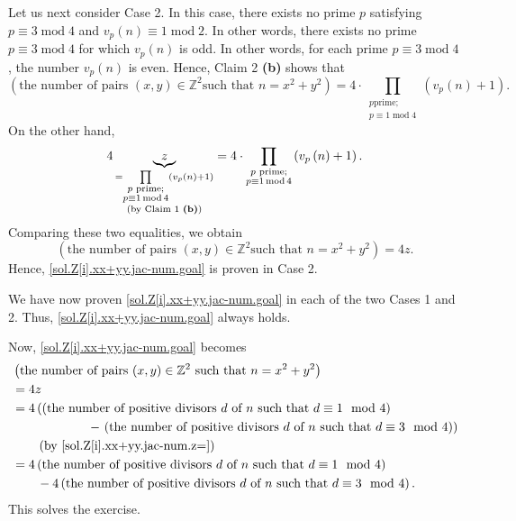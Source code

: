 \documentclass[paper=a4, fontsize=12pt]{scrartcl}%
\let\prodnonlimits\prod
\renewcommand{\prod}{\prodnonlimits\limits}
\theoremstyle{plainsl}
\theoremstyle{definition}
\theoremstyle{remark}
\begin{document}
Let us next consider Case 2. In this case, there exists no prime $p$
satisfying $p\equiv3\operatorname{mod}4$ and $v_{p}\left(  n\right)
\equiv1\operatorname{mod}2$. In other words, there exists no prime
$p\equiv3\operatorname{mod}4$ for which $v_{p}\left(  n\right)  $ is odd. In
other words, for each prime $p\equiv3\operatorname{mod}4$, the number
$v_{p}\left(  n\right)  $ is even. Hence, Claim 2 \textbf{(b)} shows that%
\[
\left(  \text{the number of pairs }\left(  x,y\right)  \in\mathbb{Z}^{2}\text{
such that }n=x^{2}+y^{2}\right)  =4\cdot\prod_{\substack{p\text{
prime;}\\p\equiv1\operatorname{mod}4}}\left(  v_{p}\left(  n\right)
+1\right)  .
\]
On the other hand,%
\[
4\underbrace{z}_{\substack{=\prod_{\substack{p\text{ prime;}\\p\equiv
1\operatorname{mod}4}}\left(  v_{p}\left(  n\right)  +1\right)  \\\text{(by
Claim 1 \textbf{(b)})}}}=4\cdot\prod_{\substack{p\text{ prime;}\\p\equiv
1\operatorname{mod}4}}\left(  v_{p}\left(  n\right)  +1\right)  .
\]
Comparing these two equalities, we obtain%
\[
\left(  \text{the number of pairs }\left(  x,y\right)  \in\mathbb{Z}^{2}\text{
such that }n=x^{2}+y^{2}\right)  =4z.
\]
Hence, \eqref{sol.Z[i].xx+yy.jac-num.goal} is proven in Case 2.

We have now proven \eqref{sol.Z[i].xx+yy.jac-num.goal} in each of the two
Cases 1 and 2. Thus, \eqref{sol.Z[i].xx+yy.jac-num.goal} always holds.

Now, \eqref{sol.Z[i].xx+yy.jac-num.goal} becomes%
\begin{align*}
&  \left(  \text{the number of pairs $\left(  x,y\right)  \in\mathbb{Z}^{2}$
such that $n=x^{2}+y^{2}$}\right) \\
&  =4z\\
&  =4\left(  \left(  \text{the number of positive divisors $d$ of $n$ such
that $d\equiv1\mod 4$}\right)  \right. \\
&  \qquad\qquad\qquad-\left.  \left(  \text{the number of positive divisors
$d$ of $n$ such that $d\equiv3\mod 4$}\right)  \right) \\
&  \qquad\left(  \text{by \eqref{sol.Z[i].xx+yy.jac-num.z=}}\right) \\
&  =4\left(  \text{the number of positive divisors $d$ of $n$ such that
$d\equiv1\mod 4$}\right) \\
&  \qquad-4\left(  \text{the number of positive divisors $d$ of $n$ such that
$d\equiv3\mod 4$}\right)  .
\end{align*}
This solves the exercise.
\end{document}
